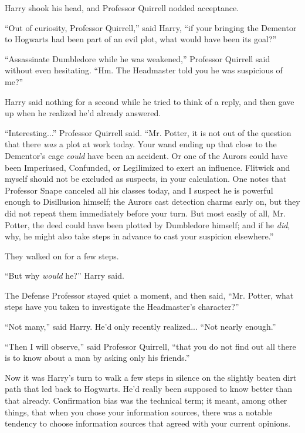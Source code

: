 Harry shook his head, and Professor Quirrell nodded acceptance.

``Out of curiosity, Professor Quirrell,'' said Harry, ``if your bringing the Dementor to Hogwarts had been part of an evil plot, what would have been its goal?''

``Assassinate Dumbledore while he was weakened,'' Professor Quirrell said without even hesitating. ``Hm. The Headmaster told you he was suspicious of me?''

Harry said nothing for a second while he tried to think of a reply, and then gave up when he realized he'd already answered.

``Interesting...'' Professor Quirrell said. ``Mr. Potter, it is not out of the question that there \emph{was} a plot at work today. Your wand ending up that close to the Dementor's cage \emph{could} have been an accident. Or one of the Aurors could have been Imperiused, Confunded, or Legilimized to exert an influence. Flitwick and myself should not be excluded as suspects, in your calculation. One notes that Professor Snape canceled all his classes today, and I suspect he is powerful enough to Disillusion himself; the Aurors cast detection charms early on, but they did not repeat them immediately before your turn. But most easily of all, Mr. Potter, the deed could have been plotted by Dumbledore himself; and if he \emph{did}, why, he might also take steps in advance to cast your suspicion elsewhere.''

They walked on for a few steps.

``But why \emph{would} he?'' Harry said.

The Defense Professor stayed quiet a moment, and then said, ``Mr. Potter, what steps have you taken to investigate the Headmaster's character?''

``Not many,'' said Harry. He'd only recently realized... ``Not nearly enough.''

``Then I will observe,'' said Professor Quirrell, ``that you do not find out all there is to know about a man by asking only his friends.''

Now it was Harry's turn to walk a few steps in silence on the slightly beaten dirt path that led back to Hogwarts. He'd really been supposed to know better than that already. Confirmation bias was the technical term; it meant, among other things, that when you chose your information sources, there was a notable tendency to choose information sources that agreed with your current opinions.


